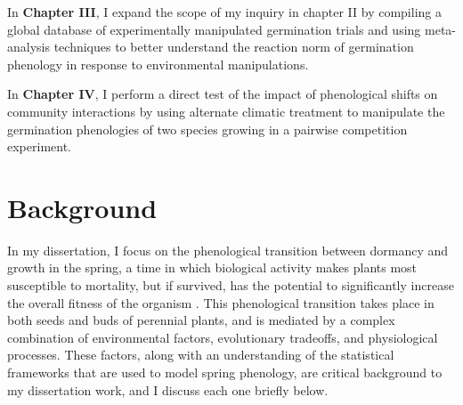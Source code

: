 \documentclass[12pt]{article}\usepackage[]{graphicx}\usepackage[]{color}
\begin{document}
\par In \textbf{Chapter III}, I expand the scope of my inquiry in chapter II by compiling a global database of experimentally manipulated germination trials and using meta-analysis techniques to better understand the reaction norm of germination phenology in response to environmental manipulations.
\par In \textbf{Chapter IV}, I perform a direct test of the impact of phenological shifts on community interactions by using alternate climatic treatment to manipulate the germination phenologies of two species growing in a pairwise competition experiment.

\section*{Background}
\indent\indent In my dissertation, I focus on the phenological transition between dormancy and growth in the spring, a time in which biological activity makes plants most susceptible to mortality, but if survived, has the potential to significantly increase the overall fitness of the organism \citep{Rathcke1985}. This phenological transition takes place in both seeds and buds of perennial plants, and is mediated by a complex combination of environmental factors, evolutionary tradeoffs, and physiological processes. These factors, along with an understanding of the statistical frameworks that are used to model spring phenology, are critical background to my dissertation work, and I discuss each one briefly below.\\
\end{document}
